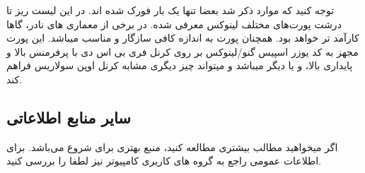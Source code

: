 توجه کنید که موارد ذکر شد بعضا تنها یک بار فورک شده اند. در این لیست ریز تا درشت
پورت‌های مختلف لینوکس معرفی شده. در برخی از معماری های نادر،
گاها کارآمد تر خواهد بود. همچنان پورت
به اندازه کافی سازگار و مناسب میباشد. این پورت مجهز به کد یوزر اسپیس گنو/لینوکس بر روی کرنل فری بی اس دی با پرفرمنس بالا و پایداری بالا،
و یا دیگر 
میباشد و میتواند چیز دیگری مشابه کرنل اوپن سولاریس فراهم کند.



\subsection{سایر منابع اطلاعاتی}

اگر میخواهید مطالب بیشتری مطالعه کنید، 
منبع بهتری برای شروع می‌باشد. برای اطلاعات عمومی راجع به گروه های کاربری کامپیوتر نیز لطفا
را بررسی کنید.


